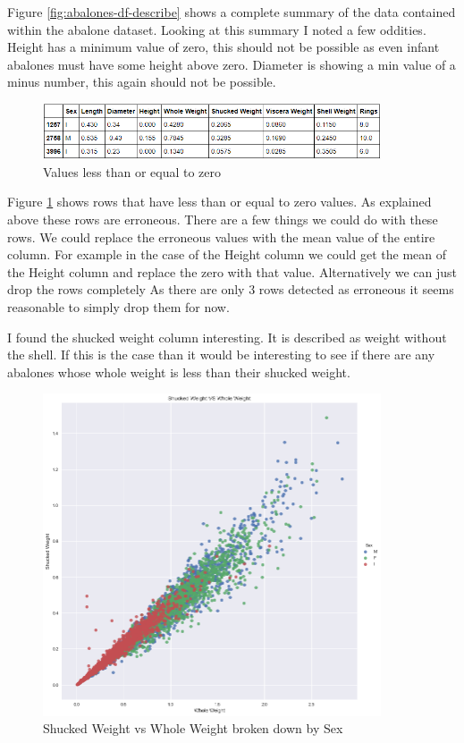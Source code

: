 Figure \ref{fig:abalones-df-describe} shows a complete summary of the data contained within the abalone dataset. Looking at this summary I noted a few oddities. Height has a minimum value of zero, this should not be possible as even infant abalones must have some height above zero. Diameter is showing a min value of a minus number, this again should not be possible.

\begin{figure}[H]
  \centering
  \includegraphics[scale=0.5,width=100mm]{./images/abalone-less-than-zero.png}
  \caption{Values less than or equal to zero}
  \label{fig:abalones-less-than-zero}
\end{figure}

Figure \ref{fig:abalones-less-than-zero} shows rows that have less than or equal to zero values. As explained above these rows are erroneous. There are a few things we could do with these rows. We could replace the erroneous values with the mean value of the entire column. For example in the case of the Height column we could get the mean of the Height column and replace the zero with that value. Alternatively we can just drop the rows completely As there are only 3 rows detected as erroneous it seems reasonable to simply drop them for now.

I found the shucked weight column interesting. It is described as weight without the shell. If this is the case than it would be interesting to see if there are any abalones whose whole weight is less than their shucked weight.

\begin{figure}[H]
  \centering
  \includegraphics[scale=0.5,width=100mm]{./images/abalone-shucked-weight-vs-whole.png}
  \caption{Shucked Weight vs Whole Weight broken down by Sex}
  \label{fig:shucked-vs-whole}
\end{figure}

